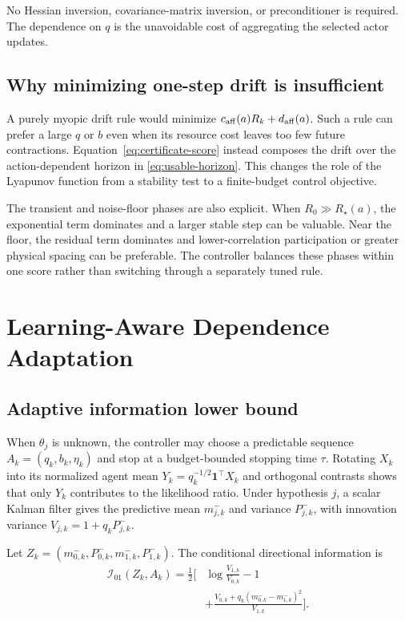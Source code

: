 \documentclass[journal]{IEEEtran}
\begin{document}
No Hessian inversion, covariance-matrix inversion, or preconditioner is required.
The dependence on $q$ is the unavoidable cost of aggregating the selected actor updates.

\subsection{Why minimizing one-step drift is insufficient}
A purely myopic drift rule would minimize $c_{\rm aff}(a)R_k+d_{\rm aff}(a)$.
Such a rule can prefer a large $q$ or $b$ even when its resource cost leaves too few future contractions.
Equation~\eqref{eq:certificate-score} instead composes the drift over the action-dependent horizon in \eqref{eq:usable-horizon}.
This changes the role of the Lyapunov function from a stability test to a finite-budget control objective.

The transient and noise-floor phases are also explicit.
When $R_0\gg R_\star(a)$, the exponential term dominates and a larger stable step can be valuable.
Near the floor, the residual term dominates and lower-correlation participation or greater physical spacing can be preferable.
The controller balances these phases within one score rather than switching through a separately tuned rule.

\section{Learning-Aware Dependence Adaptation}
\subsection{Adaptive information lower bound}
When $\theta_j$ is unknown, the controller may choose a predictable sequence $A_k=(q_k,b_k,\eta_k)$ and stop at a budget-bounded stopping time $\tau$.
Rotating $X_k$ into its normalized agent mean $Y_k=q_k^{-1/2}\bm{1}^\top X_k$ and orthogonal contrasts shows that only $Y_k$ contributes to the likelihood ratio.
Under hypothesis $j$, a scalar Kalman filter gives the predictive mean $m^-_{j,k}$ and variance $P^-_{j,k}$, with innovation variance $V_{j,k}=1+q_kP^-_{j,k}$.

Let $Z_k=(m^-_{0,k},P^-_{0,k},m^-_{1,k},P^-_{1,k})$.
The conditional directional information is
\begin{equation}
\begin{aligned}
\mathcal{I}_{01}(Z_k,A_k)=\frac12\bigg[&\log\frac{V_{1,k}}{V_{0,k}}-1\\
&+\frac{V_{0,k}+q_k(m^-_{0,k}-m^-_{1,k})^2}{V_{1,k}}\bigg].
\end{aligned}
\label{eq:conditional-kl}
\end{equation}
\end{document}
